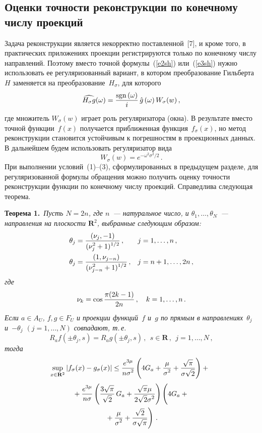 \begin{multicols}{2}
\section{Оценки точности реконструкции по конечному числу проекций}

Задача реконструкции является некорректно поставленной~[7], и кроме того, в практических 
приложениях проекции регистрируются только по конечному числу направлений. Поэтому вмес\-то точной 
формулы~(\ref{e2sh}) или~(\ref{e3sh}) нужно использовать ее регуляризованный вариант, в котором преобразование 
Гильберта~$H$ заменяется на преобразование~$H_{\sigma}$, для которого
$$
\widehat{H_{\sigma}g}(\omega)=\displaystyle\frac{\displaystyle \mathrm{sgn}\,(\omega)\mathstrut}{\displaystyle i\mathstrut}\,\hat{g}\left (\omega\right )W_{\sigma}(w)\,,
$$ 
где множитель $W_{\sigma}(w)$ играет роль регуляризатора (окна). В результате вместо точной функции~$f(x)$ 
получается приближенная функция~$f_\sigma(x)$, но метод реконструкции становится устойчивым к погрешностям 
в проекционных данных. В дальнейшем будем использовать регуляризатор вида
$$
W_{\sigma}(w)=e^{-\omega^2\sigma^2/2}\,.
$$
При выполнении условий~(1)--(3), сформулированных в предыдущем разделе, для регуляризованной формулы обращения можно 
получить оценку точности реконструкции функции по конечному числу проекций. Справедлива следующая теорема.
\medskip

\noindent
\textbf{Теорема 1.}\ \textit{Пусть $N=2n$, где $n$~--- натуральное чис\-ло, и
$\theta_{1},\ldots,\theta_{N}$~--- направления на плоскости $\mathbf{R}^{2}$, выбранные следующим
образом:}
\begin{align*}
\theta_{j}&=\displaystyle\frac{\displaystyle (\nu_{j},-1)\mathstrut}{\displaystyle (\nu_{j}^{2}+1)^{1/2}\mathstrut}\,, &j&=1,\ldots, n\,,\\
\theta_{j}&=\displaystyle\frac{\displaystyle (1,\nu_{j-n})\mathstrut}{\displaystyle (\nu_{j-n}^{2}+1)^{1/2}\mathstrut}\,, &j&=n+1,\ldots,2n\,,
\end{align*}
\textit{где}
$$
\nu_{k}=\cos\displaystyle\frac{\displaystyle \pi(2k-1)\mathstrut}{\displaystyle 2n\mathstrut}\,,\quad k=1,\ldots,n\,.
$$
\textit{Если $a\in A_U$, $f, g\in F_U$ и проекции функций~$f$ и~$g$ по прямым в направлениях~$\theta_{j}$ 
и~$-\theta_{j}$ $(j=1,\ldots,N)$ совпадают, т.\,е.}
$$
R_af(\pm\theta_j,s)=R_ag(\pm\theta_j,s)\,,\ \ s\in\mathbf{R}\,,\ \ j=1,\ldots,N\,,
$$
\textit{тогда}
%
\begin{equation*}
\!\!\sup_{x\in\mathbf{R}^{2}}\left|f_{\sigma}(x)-g_{\sigma}(x)\right|\leq\displaystyle\frac{\displaystyle e^{3\mu}\mathstrut}{\displaystyle n\sigma^2\mathstrut}
\left(4G_a+\displaystyle\frac{\displaystyle \mu\mathstrut}{\displaystyle \sigma^2\mathstrut}+\displaystyle\frac{\displaystyle \sqrt{\pi}\mathstrut}{\displaystyle \sigma\sqrt{2}\mathstrut}\right)+{}
\end{equation*}
\begin{multline}
{}+\fr{e^{3\mu}}{n\sigma}\left(\fr{3\sqrt{\pi}}{\sqrt{2}}\,G_a+\fr{\sqrt{\pi}\mu}{2\sqrt{2}\sigma^2}\right)
\left( 
\vphantom{\fr{\sqrt{2}}{\sigma\sqrt{\pi}}}
4G_a+{}\right.\\
\left.{}+\fr{\mu}{\sigma^2}+\fr{\sqrt{2}}{\sigma\sqrt{\pi}}\right)\,.
\label{e4sh}
\end{multline}


\end{multicols}
